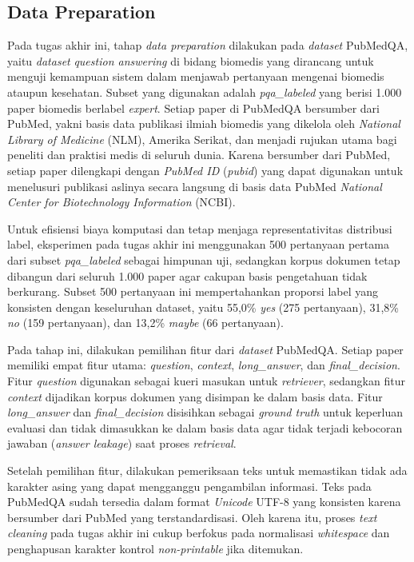 \subsection{Data Preparation}
\label{subsec:data-preparation}

Pada tugas akhir ini, tahap \textit{data preparation} dilakukan pada \textit{dataset} PubMedQA, yaitu \textit{dataset} \textit{question answering} di bidang biomedis yang dirancang untuk menguji kemampuan sistem dalam menjawab pertanyaan mengenai biomedis ataupun kesehatan. Subset yang digunakan adalah \textit{pqa\_labeled} yang berisi 1.000 paper biomedis berlabel \textit{expert}. Setiap paper di PubMedQA bersumber dari PubMed, yakni basis data publikasi ilmiah biomedis yang dikelola oleh \textit{National Library of Medicine} (NLM), Amerika Serikat, dan menjadi rujukan utama bagi peneliti dan praktisi medis di seluruh dunia. Karena bersumber dari PubMed, setiap paper dilengkapi dengan \textit{PubMed ID} (\textit{pubid}) yang dapat digunakan untuk menelusuri publikasi aslinya secara langsung di basis data PubMed \textit{National Center for Biotechnology Information} (NCBI).

Untuk efisiensi biaya komputasi dan tetap menjaga representativitas distribusi label, eksperimen pada tugas akhir ini menggunakan 500 pertanyaan pertama dari subset \textit{pqa\_labeled} sebagai himpunan uji, sedangkan korpus dokumen tetap dibangun dari seluruh 1.000 paper agar cakupan basis pengetahuan tidak berkurang. Subset 500 pertanyaan ini mempertahankan proporsi label yang konsisten dengan keseluruhan dataset, yaitu 55,0\% \textit{yes} (275 pertanyaan), 31,8\% \textit{no} (159 pertanyaan), dan 13,2\% \textit{maybe} (66 pertanyaan).

Pada tahap ini, dilakukan pemilihan fitur dari \textit{dataset} PubMedQA. Setiap paper memiliki empat fitur utama: \textit{question}, \textit{context}, \textit{long\_answer}, dan \textit{final\_decision}. Fitur \textit{question} digunakan sebagai kueri masukan untuk \textit{retriever}, sedangkan fitur \textit{context} dijadikan korpus dokumen yang disimpan ke dalam basis data. Fitur \textit{long\_answer} dan \textit{final\_decision} disisihkan sebagai \textit{ground truth} untuk keperluan evaluasi dan tidak dimasukkan ke dalam basis data agar tidak terjadi kebocoran jawaban (\textit{answer leakage}) saat proses \textit{retrieval}.

Setelah pemilihan fitur, dilakukan pemeriksaan teks untuk memastikan tidak ada karakter asing yang dapat mengganggu pengambilan informasi. Teks pada PubMedQA sudah tersedia dalam format \textit{Unicode} UTF-8 yang konsisten karena bersumber dari PubMed yang terstandardisasi. Oleh karena itu, proses \textit{text cleaning} pada tugas akhir ini cukup berfokus pada normalisasi \textit{whitespace} dan penghapusan karakter kontrol \textit{non-printable} jika ditemukan.

